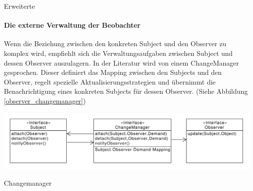 \begin{listing}[h!]
   \centering
   \caption{Erweiterte }
    \label{observer_update_with_observer}
\end{listing} 

\paragraph{Die externe Verwaltung der Beobachter} Wenn die Beziehung zwischen den konkreten Subject und den Observer zu komplex wird, empfiehlt sich die Verwaltungsaufgaben zwischen Subject und dessen Observer auszulagern. In der Literatur wird von einem ChangeManager gesprochen. Dieser definiert das Mapping zwischen den Subjects und den Observer, regelt spezielle Aktualisierungsstrategien und übernimmt die Benachrichtigung eines konkreten Subjects für dessen Observer. (Siehe Abbildung \ref{observer_changemanager})



\begin{listing}[h!]
   \centering
   \includegraphics[scale=.4]{paper/observer/changemanager}
   \caption{Changemanager}
    \label{observer_changemanager}
\end{listing} 



